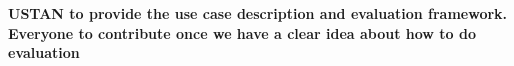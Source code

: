 \textbf{USTAN to provide the use case description and evaluation framework. Everyone to contribute once we have a clear idea about how to do evaluation}


